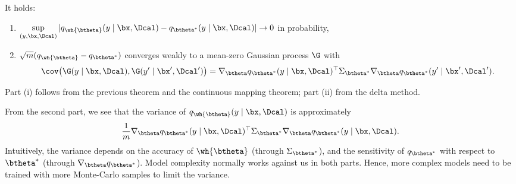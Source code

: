 \documentclass[aspectratio=169,10pt]{beamer}
\newcommand{\currentheading}{\ifx\insertsubsection\empty\insertsection\else\insertsubsection\fi}
\begin{document}
\begin{frame}{\currentheading}
\small
\begin{theorem}[B.2]\label{thm:asym-q}
It holds:
\begin{enumerate}
	\item[(i)] $\displaystyle \sup_{(y, \bx, \Dcal)}|q_{\wh{\btheta}}(y\mid \bx, \Dcal) - q_{\btheta^*}(y \mid \bx, \Dcal)| \to 0$ in probability,
	\item[(ii)] $\sqrt{m}(q_{\wh{\btheta}} - q_{\btheta^*})$ converges weakly to a mean-zero Gaussian process $\G$ with
	      \begin{align*}
		      \cov\bigl(\G(y\mid \bx, \Dcal), \G(y'\mid \bx', \Dcal')  \bigr)
		      = \nabla_{\btheta} q_{\btheta^*}(y\mid \bx, \Dcal)^\top \Sigma_{\btheta^*} \nabla_{\btheta} q_{\btheta^*}(y'\mid \bx', \Dcal').
	      \end{align*}
\end{enumerate}
\end{theorem}
Part (i) follows from the previous theorem and the continuous mapping theorem; part (ii) from the delta method.
\end{frame}

\begin{frame}{\currentheading}
From the second part, we see that the variance of $q_{\wh{\btheta}}(y\mid \bx, \Dcal)$ is approximately
\begin{align*}
	\frac 1 m \nabla_{\btheta} q_{\btheta^*}(y\mid \bx, \Dcal)^\top \Sigma_{\btheta^*} \nabla_{\btheta} q_{\btheta^*}(y\mid \bx, \Dcal).
\end{align*}
Intuitively, the variance depends on the accuracy of $\wh{\btheta}$ (through $\Sigma_{\btheta^*}$), and the sensitivity of $q_{\btheta^*}$ with respect to $\btheta^*$ (through $\nabla_{\btheta} q_{\btheta^*}$). Model complexity normally works against us in both parts. Hence, more complex models need to be trained with more Monte-Carlo samples to limit the variance.
\end{frame}
\end{document}
